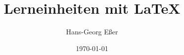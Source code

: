 \documentclass[a4paper,DIV7,11pt,headincludem,numbers=noendperiod]{scrbook}
\title{Lerneinheiten mit \textrm{\LaTeX{}}}
\author{Hans-Georg Eßer}
\date{\today}
\newcommand\IncludeChapters{


}
\begin{document}
\setlength{\parskip}{5pt}
\setlength{\parindent}{0pt}
\maketitle

\renewcommand*\chapterpagestyle{scrheadings}

\ActivateBG

\begin{adjmulticols}{1}{0cm}{-5.2cm}

\tableofcontents

\end{adjmulticols}


\IncludeChapters




\createbackmatter
\end{document}

